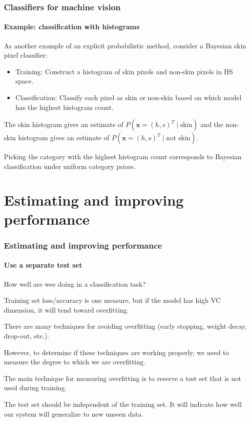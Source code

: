 \documentclass[aspectratio=169]{beamer}
\renewcommand{\vec}[1]{\boldsymbol{#1}}
\begin{document}
\begin{frame}
\frametitle{Classifiers for machine vision}
\framesubtitle{Example: classification with histograms}

As another example of an explicit probabilistic method, consider
a Bayesian \alert{skin pixel classifier}:
\begin{itemize}
\item \alert{Training}: Construct a histogram of skin pixels and
  non-skin pixels in HS space.
\item \alert{Classification}: Classify each pixel as skin or non-skin
  based on which model has the highest histogram count.
\end{itemize}

The skin histogram gives an estimate of $P(\vec{x}=(h, s)^T \mid
\mbox{skin})$ and the non-skin histogram gives an estimate of
$P(\vec{x}=(h, s)^T \mid \mbox{not skin})$.

\medskip

Picking the category with the highest histogram count corresponds to
Bayesian classification under \alert{uniform category priors}.

\end{frame}

\section{Estimating and improving performance}

\begin{frame}
\frametitle{Estimating and improving performance}
\framesubtitle{Use a separate test set}

How well are wee doing in a classification task?

\medskip

\alert{Training set loss/accuracy} is one measure, but if the model
has high VC dimension, it will tend toward \alert{overfitting}.

\medskip

There are many techniques for avoiding overfitting (early stopping,
weight decay, drop-out, etc.).

\medskip

However, to determine if these techniques are working properly, we
need to \alert{measure} the degree to which we are overfitting.

\medskip

The main technique for measuring overfitting is to reserve a
\alert{test set} that is not used during training.

\medskip

The test set should be independent of the training set. It will
indicate how well our system will \alert{generalize} to new unseen
data.

\end{frame}
\end{document}
